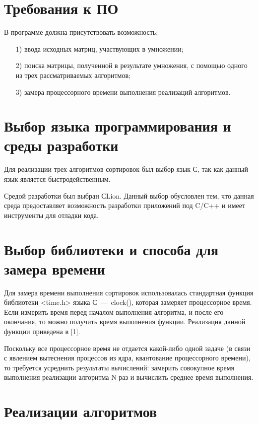\documentclass[12pt]{report}
\begin{document}
	\section{Требования к ПО}
	
	В программе должна присутствовать возможность:
	
	\begin{enumerate}
		\item[1)] ввода исходных матриц, участвующих в умножении;
		\item[2)] поиска матрицы, полученной в результате умножения, с помощью одного из трех рассматриваемых алгоритмов;
		\item[3)] замера процессорного времени выполнения реализаций алгоритмов.
	\end{enumerate}
	
	\section{Выбор языка программирования и среды разработки}
	
	Для реализации трех алгоритмов сортировок был выбор язык С, так как данный язык является быстродейственным.

	Средой разработки был выбран СLion. Данный выбор обусловлен тем, что данная среда предоставляет возможность разработки приложений под C/C++ и имеет инструменты для отладки кода. 
	
	\section{Выбор библиотеки и способа для замера времени}
		Для замера времени выполнения сортировок использовалась стандартная функция библиотеки <time.h> языка С~---~clock(), которая замеряет процессорное время. Если измерить время перед началом выполнения алгоритма, и после его окончания, то можно получить время выполнения функции. Реализация данной функции приведена в [1].
		
		Поскольку все процессорное время не отдается какой-либо одной задаче (в связи с явлением вытеснения процессов из ядра, квантование процессорного времени), то требуется усреднить результаты вычислений: замерить совокупное время выполнения реализации алгоритма N раз и вычислить среднее время выполнения.
		
	\section{Реализации алгоритмов}
	
\end{document}
